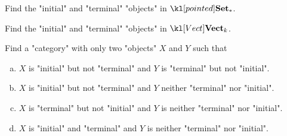 \documentclass[main.tex]{subfiles}
\begin{document}
\begin{exer}\label{exer:duality:zeroinptd}
	Find the "initial" and "terminal" "objects" in $\catPtd$.
\end{exer}
\begin{exer}\label{exer:duality:zeroinvect}
	Find the "initial" and "terminal" "objects" in $\catVect{k}$.
\end{exer}
\begin{exer}\label{exer:duality:terminalinitial}
	Find a "category" with only two "objects" $X$ and $Y$ such that
	\begin{enumerate}[(a)]
		\item $X$ is "initial" but not "terminal" and $Y$ is "terminal" but not "initial".
		\item $X$ is "initial" but not "terminal" and $Y$ neither "terminal" nor "initial".
		\item $X$ is "terminal" but not "initial" and $Y$ is neither "terminal" nor "initial".
		\item $X$ is "initial" and "terminal" and $Y$ is neither "terminal" nor "initial".
	\end{enumerate} 
\end{exer}
\end{document}
